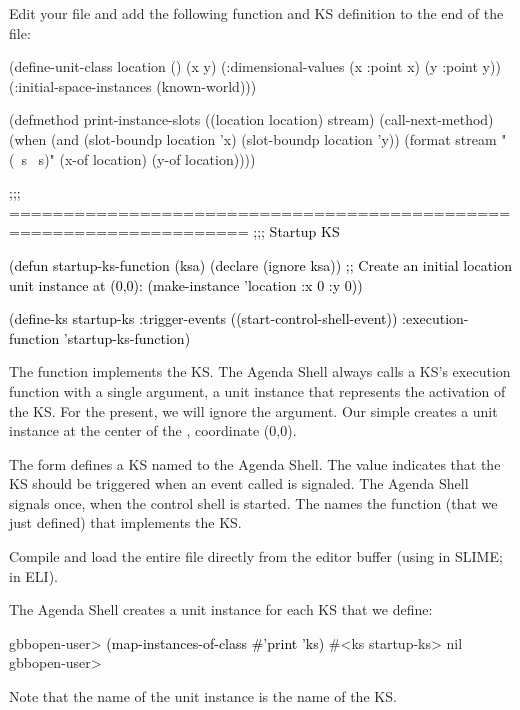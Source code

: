 \documentclass[10pt,twoside,english,pdftex]{article}
\begin{document}
%
%
Edit your  file and add the following
function and KS definition to the end of the
 file:
%
\W\supp
\begin{example}
\textcolor{darkergray}{%
  (define-unit-class location ()
    (x y)
    (:dimensional-values
      (x :point x)
      (y :point y))
    (:initial-space-instances (known-world)))

  (defmethod print-instance-slots ((location location) stream)
    (call-next-method)
    (when (and (slot-boundp location 'x)
               (slot-boundp location 'y))
      (format stream " (~s ~s)"
              (x-of location)
              (y-of location))))

  \textcolor{black}{;;; ====================================================================
  ;;;   Startup KS

  (defun startup-ks-function (ksa)
    (declare (ignore ksa))
    ;; Create an initial location unit instance at (0,0):
    (make-instance 'location :x 0 :y 0))

  (define-ks startup-ks
      :trigger-events ((start-control-shell-event))
      :execution-function 'startup-ks-function)}}
\end{example}

The function  implements the KS.  The Agenda
Shell always calls a KS's execution function with a single argument, a
 unit instance that represents the activation of the KS.  For the
present, we will ignore the  argument.  Our simple
 creates a  unit
instance at the center of the , coordinate (0,0).

The  form defines a KS named 
to the Agenda Shell.  The  value indicates that
the KS should be triggered when an event called
 is signaled.  The Agenda Shell signals
 once, when the control shell is
started.  The  names the function (that we
just defined) that implements the KS.

Compile and load the entire  file directly
from the editor buffer (using  in SLIME;  in ELI).

The Agenda Shell creates a  unit instance for each KS that we
define:
%
\W\supp
\begin{example}
\textcolor{darkergray}{%
  gbbopen-user> \textcolor{black}{(map-instances-of-class #'print 'ks)}
  #<ks startup-ks> 
  nil
  gbbopen-user>}
\end{example}
%
Note that the name of the  unit instance is the name of the KS.
\end{document}

